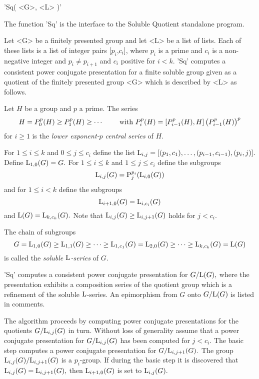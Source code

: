 
'Sq( <G>, <L> )'

The function  'Sq' is  the  interface to the  Soluble Quotient standalone
program.

Let <G> be  a finitely presented group  and let <L> be  a list  of lists.
Each of these lists is a list of integer pairs [$p_i$,$c_i$], where $p_i$
is  a prime and  $c_i$ is a  non-negative integer and $p_i \not= p_{i+1}$
and $c_i$ positive for  $i < k.$   'Sq' computes a  consistent
power conjugate   presentation  for a  finite  soluble group  given  as a
quotient of the finitely presented group <G> which is described by <L> as
follows.

Let  $H$ be a  group and  $p$ a  prime.  The  series  $$H = {P}^p_0(H)\ge
{P}^p_1(H)\ge\cdots\,\,\hbox  to  1.5   cm{\hfil  with\ }    {P}^p_i(H) =
[{P}^p_{i-1}(H),H] \left({P}^p_{i-1} (H)\right)^p$$ for $i  \ge 1$ is the
{\it lower exponent-$p$ central series} of $H.$

For $1 \le i \le k$ and $0 \le j \le  c_i$ define the list ${\rm L}_{i,j}
=   [(p_1,c_1),\ldots,  (p_{i-1},c_{i-1}),(p_{i}, j)    ].$ Define  ${\rm
L}_{1,0}(G) = G.$ For $1  \le i \le  k$ and $1  \le j \le c_i$ define the
subgroups  $${\rm L}_{i,j}(G) =  {\rm  P}_{j}^{p_i}( {\rm L}_{i,0}(G) )$$
and for $1  \le i <  k$ define the  subgroups $${\rm L}_{i+1,0}(G) = {\rm
L}_{i,c_i}(G)$$ and ${\rm L}(G)  = {\rm  L}_{k,c_k}(G).$ Note that  ${\rm
L}_{i,j}(G) \ge {\rm L}_{i,j+1}(G)$ holds for $j < c_i.$

The chain of subgroups $$G  = {\rm L}_{1,0}(G)  \ge {\rm L}_{1,1}(G)  \ge
\cdots  \ge {\rm L}_{1,c_1}(G)    = {\rm L}_{2,0}(G)\ge \cdots   \ge {\rm
L}_{k,c_k}(G) = {\rm  L}(G)  $$   is   called  the  {\it  soluble   ${\rm
L}$-series} of $G.$

'Sq' computes  a  consistent  power  conjugate  presentation for  $G/{\rm
L}(G),$ where  the   presentation exhibits a  composition  series  of the
quotient group which is a refinement of the soluble ${\rm L}$-series.  An
epimorphism from $G$ onto $G/{\rm L}(G)$ is listed in comments.

The algorithm proceeds by computing power conjugate presentations for the
quotients  $G/{\rm L}_{i,j}(G)$ in   turn.   Without loss of   generality
assume that a  power conjugate presentation  for $G/{\rm L}_{i,j}(G)$ has
been computed  for $j < c_i.$ The  basic step computes a  power conjugate
presentation for $G/{\rm L}_{i,j+1}(G).$ The group ${\rm L}_{i,j}(G)/{\rm
L}_{i,j+1}(G)$  is  a  $p_{i}$-group.   If  during  the  basic step it is
discovered that ${\rm  L}_{i,j}(G)   = {\rm L}_{i,j+1}(G),$  then   ${\rm
L}_{i+1,0}(G)$ is set to ${\rm L}_{i,j}(G).$

